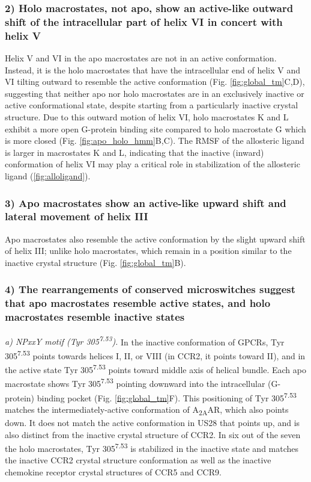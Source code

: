\subsubsection{2) Holo macrostates, not apo, show an active-like outward shift of the intracellular part of helix VI in concert with helix V}
Helix V and VI in the apo macrostates are not in an active conformation.
Instead, it is the holo macrostates that have the intracellular end of helix V and VI tilting outward to resemble the active conformation (Fig. \ref{fig:global_tm}C,D), suggesting that neither apo nor holo macrostates are in an exclusively inactive or active conformational state, despite starting from a particularly inactive crystal structure.
Due to this outward motion of helix VI, holo macrostates K and L exhibit a more open G-protein binding site compared to holo macrostate G which is more closed (Fig. \ref{fig:apo_holo_hmm}B,C). The RMSF of the allosteric ligand is larger in macrostates K and L, indicating that the inactive (inward) conformation of helix VI may play a critical role in stabilization of the allosteric ligand (\cref{fig:alloligand}).

\subsubsection{3) Apo macrostates show an active-like upward shift and lateral movement of helix III}
Apo macrostates also resemble the active conformation by the slight upward shift of helix III; unlike holo macrostates, which remain in a position similar to the inactive crystal structure (Fig. \ref{fig:global_tm}B).

\subsubsection{4) The rearrangements of conserved microswitches suggest that apo macrostates resemble active states, and holo macrostates resemble inactive states}
\emph{a) NPxxY motif (Tyr 305\textsuperscript{7.53}).}
In the inactive conformation of GPCRs, Tyr 305\textsuperscript{7.53} points towards helices I, II, or VIII (in CCR2, it points toward II), and in the active state Tyr 305\textsuperscript{7.53} points toward middle axis of helical bundle\cite{Katritch2013}.
Each apo macrostate shows Tyr 305\textsuperscript{7.53} pointing downward into the intracellular (G-protein) binding pocket (Fig. \ref{fig:global_tm}F).
This positioning of Tyr 305\textsuperscript{7.53} matches the intermediately-active conformation of A\textsubscript{2A}AR, which also points down. It does not match the active conformation in US28 that points up, and is also distinct from the inactive crystal structure of CCR2.
In six out of the seven the holo macrostates, Tyr 305\textsuperscript{7.53} is stabilized in the inactive state and matches the inactive CCR2 crystal structure conformation as well as the inactive chemokine receptor crystal structures of CCR5 and CCR9.

